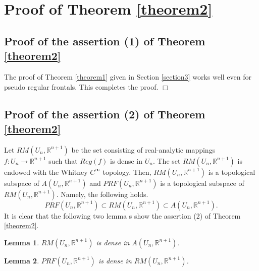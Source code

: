 \documentclass{amsart}
\newtheorem{lemma}{Lemma}[section]
\theoremstyle{definition}
\theoremstyle{definition}
\theoremstyle{definition}
\newcommand{\mb}{\mathbb}
\newcommand{\ch}[1]{{\color{black} #1}}
\begin{document}
\section{Proof of Theorem \ref{theorem2}}\label{section4}
{\color{black} 
\subsection{Proof of the assertion (1) of Theorem \ref{theorem2}} 
\label{subsection4.1}
The proof of Theorem \ref{theorem1} given in Section \ref{section3} 
works well even for pseudo regular 
frontals.   This completes the proof.    
\hfill $\Box$
\subsection{Proof of the assertion (2) of Theorem \ref{theorem2}} 
\label{subsection4.2}   
Let $RM\left(U_n, \mathbb{R}^{n+1}\right)$ be the set 
consisting of {\color{black}real-analytic} mappings $f: U_n\to \mathbb{R}^{n+1}$ 
such that $Reg(f)$ is dense in $U_n$.     The set 
$RM\left(U_n, \mathbb{R}^{n+1}\right)$ is endowed with the Whitney 
$C^\infty$ topology.   
Then,  
$RM\left(U_n, \mathbb{R}^{n+1}\right)$ is a topological subspace 
of $A\left(U_n, \mathbb{R}^{n+1}\right)$ and 
$PRF\left(U_n, \mathbb{R}^{n+1}\right)$ is a topological subspace of 
$RM\left(U_n, \mathbb{R}^{n+1}\right)$.   Namely, the following holds.  
\[
PRF\left(U_n, \mathbb{R}^{n+1}\right)\subset 
RM\left(U_n, \mathbb{R}^{n+1}\right)\subset 
A\left(U_n, \mathbb{R}^{n+1}\right).
\]   
It is clear that the following two lemma\ch{s} 
show the assertion (2) of Theorem \ref{theorem2}.  
\begin{lemma}\label{lemma4.1}
$RM\left(U_n, \mathbb{R}^{n+1}\right)$ is dense in 
 \ch{$A(U_n,\mb{R}^{n+1})$}.  
\end{lemma}
\begin{lemma}\label{lemma4.2}
$PRF\left(U_n, \mathbb{R}^{n+1}\right)$ is dense in 
$RM\left(U_n, \mathbb{R}^{n+1}\right)$.  
\end{lemma}
} 
\end{document}
